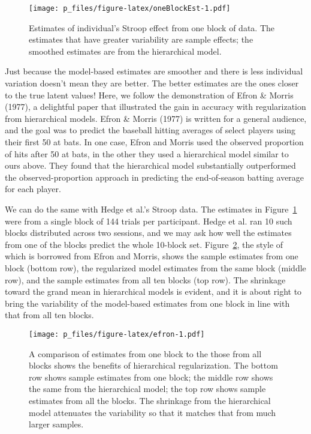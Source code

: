 \documentclass[english,man]{apa6}
\theoremstyle{definition}
\theoremstyle{definition}
\theoremstyle{remark}
\begin{document}
\begin{figure}[htbp]
\centering
\texttt{[image: p\_files/figure-latex/oneBlockEst-1.pdf]}
\caption{\label{fig:oneBlockEst}Estimates of individual's Stroop effect from
one block of data. The estimates that have greater variability are
sample effects; the smoothed estimates are from the hierarchical model.}
\end{figure}

Just because the model-based estimates are smoother and there is less
individual variation doesn't mean they are better. The better estimates
are the ones closer to the true latent values! Here, we follow the
demonstration of Efron \& Morris (1977), a delightful paper that
illustrated the gain in accuracy with regularization from hierarchical
models. Efron \& Morris (1977) is written for a general audience, and
the goal was to predict the baseball hitting averages of select players
using their first 50 at bats. In one case, Efron and Morris used the
observed proportion of hits after 50 at bats, in the other they used a
hierarchical model similar to ours above. They found that the
hierarchical model substantially outperformed the observed-proportion
approach in predicting the end-of-season batting average for each
player.

We can do the same with Hedge et al.'s Stroop data. The estimates in
Figure~\ref{fig:oneBlockEst} were from a single block of 144 trials per
participant. Hedge et al. ran 10 such blocks distributed across two
sessions, and we may ask how well the estimates from one of the blocks
predict the whole 10-block set. Figure~\ref{fig:efron}, the style of
which is borrowed from Efron and Morris, shows the sample estimates from
one block (bottom row), the regularized model estimates from the same
block (middle row), and the sample estimates from all ten blocks (top
row). The shrinkage toward the grand mean in hierarchical models is
evident, and it is about right to bring the variability of the
model-based estimates from one block in line with that from all ten
blocks.

\begin{figure}[htbp]
\centering
\texttt{[image: p\_files/figure-latex/efron-1.pdf]}
\caption{\label{fig:efron}A comparison of estimates from one block to the
those from all blocks shows the benefits of hierarchical regularization.
The bottom row shows sample estimates from one block; the middle row
shows the same from the hierarchical model; the top row shows sample
estimates from all the blocks. The shrinkage from the hierarchical model
attenuates the variability so that it matches that from much larger
samples.}
\end{figure}
\end{document}

